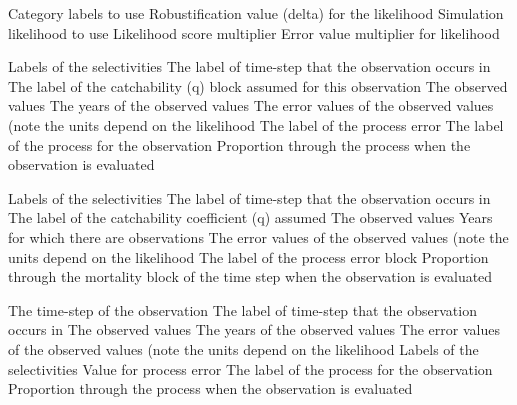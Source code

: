  {Category labels to use}
 {Robustification value (delta) for the likelihood}
 {Simulation likelihood to use}
 {Likelihood score multiplier}
 {Error value multiplier for likelihood}
\par\textbf{}\par
{} {Labels of the selectivities}
 {The label of time-step that the observation occurs in}
 {The label of the catchability (q) block assumed for this observation}
 {The observed values}
 {The years of the observed values}
 {The error values of the observed values (note the units depend on the likelihood}
 {The label of the process error}
 {The label of the process for the observation}
 {Proportion through the process when the observation is evaluated}
\par\textbf{}\par
{} {Labels of the selectivities}
 {The label of time-step that the observation occurs in}
 {The label of the catchability coefficient (q) assumed}
 {The observed values}
 {Years for which there are observations}
 {The error values of the observed values (note the units depend on the likelihood}
 {The label of the process error block}
 {Proportion through the mortality block of the time step when the observation is evaluated}
\par\textbf{}\par
{} {The time-step of the observation}
 {The label of time-step that the observation occurs in}
 {The observed values}
 {The years of the observed values}
 {The error values of the observed values (note the units depend on the likelihood}
 {Labels of the selectivities}
 {Value for process error}
 {The label of the process for the observation}
 {Proportion through the process when the observation is evaluated}
\par\textbf{}\par
